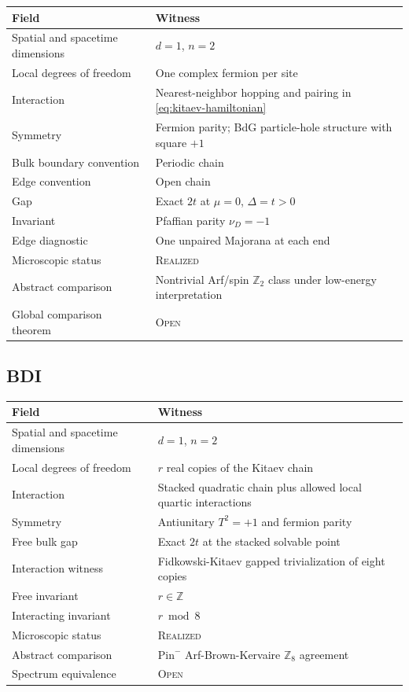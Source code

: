 \documentclass[12pt]{article}
\theoremstyle{definition}
\theoremstyle{remark}
\newcommand{\REAL}{\textnormal{\textsc{Realized}}}
\newcommand{\OPEN}{\textnormal{\textsc{Open}}}
\begin{document}
\begin{longtable}{>{\raggedright\arraybackslash}p{}
                  >{\raggedright\arraybackslash}p{}}
\toprule
Field & Witness \\
\midrule
Spatial and spacetime dimensions & $d=1$, $n=2$ \\
Local degrees of freedom & One complex fermion per site \\
Interaction & Nearest-neighbor hopping and pairing in \cref{eq:kitaev-hamiltonian} \\
Symmetry & Fermion parity; BdG particle-hole structure with square $+1$ \\
Bulk boundary convention & Periodic chain \\
Edge convention & Open chain \\
Gap & Exact $2t$ at $\mu=0$, $\Delta=t>0$ \\
Invariant & Pfaffian parity $\nu_D=-1$ \\
Edge diagnostic & One unpaired Majorana at each end \\
Microscopic status & \REAL{} \\
Abstract comparison & Nontrivial Arf/spin $\mathbb Z_2$ class under low-energy interpretation \\
Global comparison theorem & \OPEN{} \\
\bottomrule
\end{longtable}

\subsection{BDI}

\begin{longtable}{>{\raggedright\arraybackslash}p{}
                  >{\raggedright\arraybackslash}p{}}
\toprule
Field & Witness \\
\midrule
Spatial and spacetime dimensions & $d=1$, $n=2$ \\
Local degrees of freedom & $r$ real copies of the Kitaev chain \\
Interaction & Stacked quadratic chain plus allowed local quartic interactions \\
Symmetry & Antiunitary $T^2=+1$ and fermion parity \\
Free bulk gap & Exact $2t$ at the stacked solvable point \\
Interaction witness & Fidkowski-Kitaev gapped trivialization of eight copies \\
Free invariant & $r\in\mathbb Z$ \\
Interacting invariant & $r\bmod 8$ \\
Microscopic status & \REAL{} \\
Abstract comparison & $\mathrm{Pin}^-$ Arf-Brown-Kervaire $\mathbb Z_8$ agreement \\
Spectrum equivalence & \OPEN{} \\
\bottomrule
\end{longtable}
\end{document}
